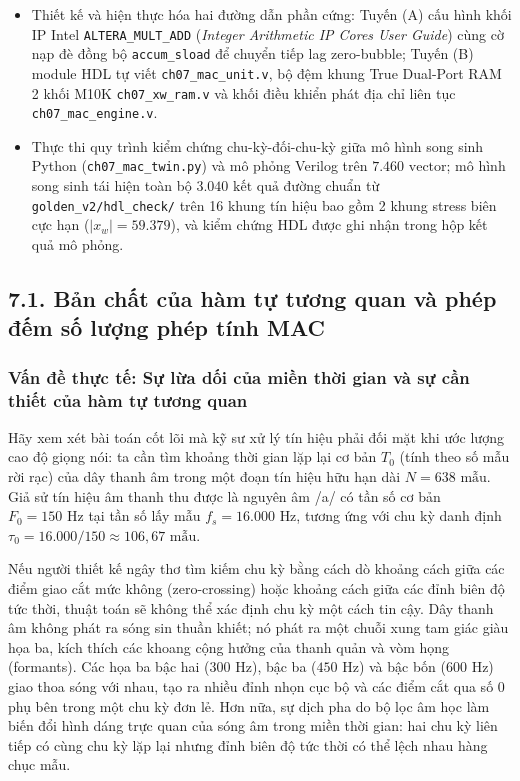 \begin{learningobj}
\begin{itemize}[leftmargin=1.5em, itemsep=2pt]
    \item Thiết kế và hiện thực hóa hai đường dẫn phần cứng: Tuyến (A) cấu hình khối IP Intel \texttt{ALTERA\_MULT\_ADD} (\emph{Integer Arithmetic IP Cores User Guide}) cùng cờ nạp đè đồng bộ \texttt{accum\_sload} để chuyển tiếp lag zero-bubble; Tuyến (B) module HDL tự viết \texttt{ch07\_mac\_unit.v}, bộ đệm khung True Dual-Port RAM 2 khối M10K \texttt{ch07\_xw\_ram.v} và khối điều khiển phát địa chỉ liên tục \texttt{ch07\_mac\_engine.v}.
    \item Thực thi quy trình kiểm chứng chu-kỳ-đối-chu-kỳ giữa mô hình song sinh Python (\texttt{ch07\_mac\_twin.py}) và mô phỏng Verilog trên $7.460\text{ vector}$; mô hình song sinh tái hiện toàn bộ $3.040\text{ kết quả}$ đường chuẩn từ \texttt{golden\_v2/hdl\_check/} trên 16 khung tín hiệu bao gồm 2 khung stress biên cực hạn ($|x_w| = 59.379$), và kiểm chứng HDL được ghi nhận trong hộp kết quả mô phỏng.
\end{itemize}
\end{learningobj}

\subsection*{7.1. Bản chất của hàm tự tương quan và phép đếm số lượng phép tính MAC}

\subsubsection*{Vấn đề thực tế: Sự lừa dối của miền thời gian và sự cần thiết của hàm tự tương quan}
Hãy xem xét bài toán cốt lõi mà kỹ sư xử lý tín hiệu phải đối mặt khi ước lượng cao độ giọng nói: ta cần tìm khoảng thời gian lặp lại cơ bản $T_0$ (tính theo số mẫu rời rạc) của dây thanh âm trong một đoạn tín hiệu hữu hạn dài $N = 638\text{ mẫu}$. Giả sử tín hiệu âm thanh thu được là nguyên âm /a/ có tần số cơ bản $F_0 = 150\text{ Hz}$ tại tần số lấy mẫu $f_s = 16.000\text{ Hz}$, tương ứng với chu kỳ danh định $\tau_0 = 16.000 / 150 \approx 106{,}67\text{ mẫu}$.

Nếu người thiết kế ngây thơ tìm kiếm chu kỳ bằng cách dò khoảng cách giữa các điểm giao cắt mức không (zero-crossing) hoặc khoảng cách giữa các đỉnh biên độ tức thời, thuật toán sẽ không thể xác định chu kỳ một cách tin cậy. Dây thanh âm không phát ra sóng sin thuần khiết; nó phát ra một chuỗi xung tam giác giàu họa ba, kích thích các khoang cộng hưởng của thanh quản và vòm họng (formants). Các họa ba bậc hai ($300\text{ Hz}$), bậc ba ($450\text{ Hz}$) và bậc bốn ($600\text{ Hz}$) giao thoa sóng với nhau, tạo ra nhiều đỉnh nhọn cục bộ và các điểm cắt qua số $0$ phụ bên trong một chu kỳ đơn lẻ. Hơn nữa, sự dịch pha do bộ lọc âm học làm biến đổi hình dáng trực quan của sóng âm trong miền thời gian: hai chu kỳ liên tiếp có cùng chu kỳ lặp lại nhưng đỉnh biên độ tức thời có thể lệch nhau hàng chục mẫu.

